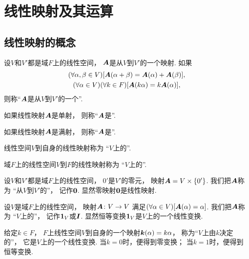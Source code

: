 \section{线性映射及其运算}
\subsection{线性映射的概念}
\begin{definition}
设\(V\)和\(V'\)都是域\(F\)上的线性空间，
\(\boldsymbol{A}\)是从\(V\)到\(V'\)的一个映射.
如果\begin{gather*}
	(\forall\alpha,\beta\in V)
	[\boldsymbol{A}(\alpha+\beta)=\boldsymbol{A}(\alpha)+\boldsymbol{A}(\beta)], \\
	(\forall\alpha\in V)
	(\forall k\in F)
	[\boldsymbol{A}(k\alpha)=k\boldsymbol{A}(\alpha)],
\end{gather*}
则称“\(\boldsymbol{A}\)是从\(V\)到\(V'\)的一个”.
\end{definition}

如果线性映射\(\boldsymbol{A}\)是单射，
则称“\(\boldsymbol{A}\)是”.

如果线性映射\(\boldsymbol{A}\)是满射，
则称“\(\boldsymbol{A}\)是”.

线性空间\(V\)到自身的线性映射称为
“\(V\)上的”.

域\(F\)上的线性空间\(V\)到\(F\)的线性映射称为
“\(V\)上的”.

\begin{example}
设\(V\)和\(V'\)都是域\(F\)上的线性空间，
\(0'\)是\(V'\)的零元，
映射\(\boldsymbol{A}=V\times\{0'\}\).
我们把\(\boldsymbol{A}\)称为
“从\(V\)到\(V'\)的”，
记作\(\boldsymbol0\).
显然零映射\(\boldsymbol0\)是线性映射.
\end{example}

\begin{example}
设\(V\)是域\(F\)上的线性空间，
映射\(\boldsymbol{A}\colon V\to V\)
满足\((\forall\alpha\in V)[\boldsymbol{A}(\alpha)=\alpha]\).
我们把\(\boldsymbol{A}\)称为
“\(V\)上的”，
记作\(\boldsymbol1_V\)或\(\boldsymbol{I}\).
显然恒等变换\(\boldsymbol1_V\)是\(V\)上的一个线性变换.
\end{example}

\begin{example}
给定\(k\in F\)，
\(F\)上线性空间\(V\)到自身的一个映射\(\boldsymbol{k}(\alpha)=k\alpha\)，
称为“\(V\)上由\(k\)决定的”，
它是\(V\)上的一个线性变换.
当\(k=0\)时，便得到零变换；
当\(k=1\)时，便得到恒等变换.
\end{example}

